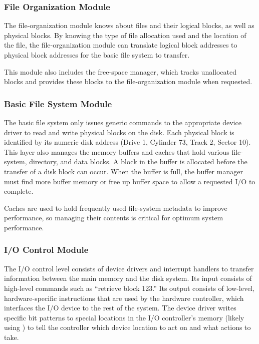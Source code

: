 \subsubsection{File Organization Module}\label{subsubsec:File_Organization_FS_Module}
The file-organization module knows about files and their logical blocks, as well as physical blocks.
By knowing the type of file allocation used and the location of the file, the file-organization module can translate logical block addresses to physical block addresses for the basic file system to transfer.

This module also includes the free-space manager, which tracks unallocated blocks and provides these blocks to the file-organization module when requested.

\subsubsection{Basic File System Module}\label{subsubsec:Basic_FS_Module}
The basic file system only issues generic commands to the appropriate device driver to read and write physical blocks on the disk.
Each physical block is identified by its numeric disk address (Drive 1, Cylinder 73, Track 2, Sector 10).
This layer also manages the memory buffers and caches that hold various file-system, directory, and data blocks.
A block in the buffer is allocated before the transfer of a disk block can occur.
When the buffer is full, the buffer manager must find more buffer memory or free up buffer space to allow a requested I/O to complete.

Caches are used to hold frequently used file-system metadata to improve performance, so managing their contents is critical for optimum system performance.

\subsubsection{I/O Control Module}\label{subsubsec:IO_Control_FS_Module}
The I/O control level consists of device drivers and interrupt handlers to transfer information between the main memory and the disk system.
Its input consists of high-level commands such as ``retrieve block 123.''
Its output consists of low-level, hardware-specific instructions that are used by the hardware controller, which interfaces the I/O device to the rest of the system.
The device driver writes specific bit patterns to special locations in the I/O controller’s memory (likely using ) to tell the controller which device location to act on and what actions to take.

